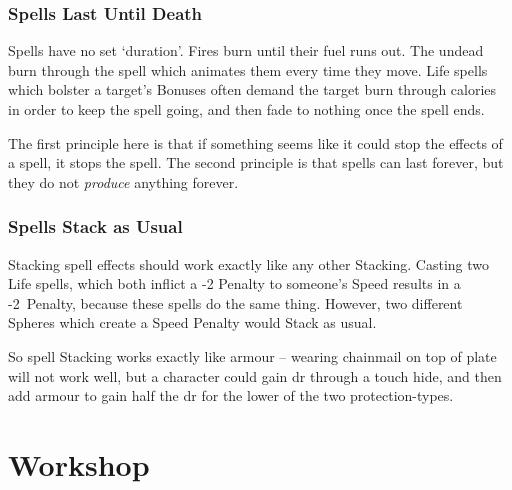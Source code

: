 \begin{multicols}{2}
\subsubsection{Spells Last Until Death}

Spells have no set `duration'.
Fires burn until their fuel runs out.
The undead burn through the spell which animates them every time they move.
Life spells which bolster a target's Bonuses often demand the target burn through calories in order to keep the spell going, and then fade to nothing once the spell ends.

The first principle here is that if something seems like it could stop the effects of a spell, it stops the spell.
The second principle is that spells can last forever, but they do not \emph{produce} anything forever.

\subsubsection{Spells Stack as Usual}

Stacking spell effects should work exactly like any other Stacking.%
Casting two Life spells, which both inflict a -2 Penalty to someone's Speed results in a -2~Penalty, because these spells do the same thing.
However, two different Spheres which create a Speed Penalty would Stack as usual.

So spell Stacking works exactly like armour -- wearing chainmail on top of plate will not work well, but a character could gain \gls{dr} through a touch hide, and then add armour to gain half the \gls{dr} for the lower of the two protection-types.

\end{multicols}

{
  \centering
  \speltogram
  \label{speltogram}
}

\section{ Workshop}

